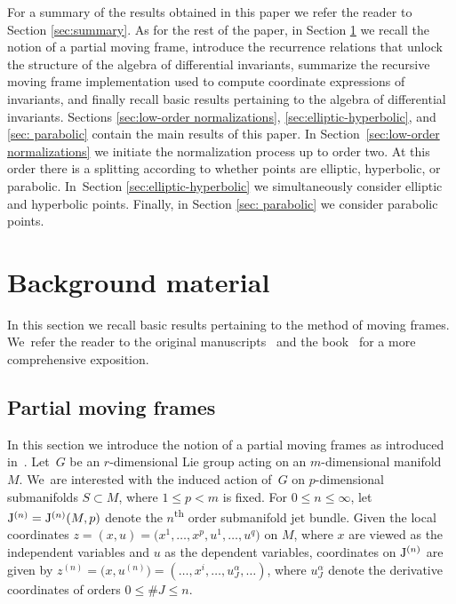 \documentclass[10pt,a4paper]{amsart}
\numberwithin{equation}{section}
\newcommand{\J}{{\rm J}}
\newcommand{\n}{^{(n)}}
\begin{document}
 For a summary of the results obtained in this paper we refer the reader to Section \ref{sec:summary}. As for the rest of the paper, in Section \ref{sec:background} we recall the notion of a partial moving frame, introduce the recurrence relations that unlock the structure of the algebra of differential invariants, summarize the recursive moving frame implementation used to compute coordinate expressions of invariants, and finally recall basic results pertaining to the algebra of differential invariants. Sections \ref{sec:low-order normalizations}, \ref{sec:elliptic-hyperbolic}, and \ref{sec: parabolic} contain the main results of this paper. In Section~\ref{sec:low-order normalizations} we initiate the normalization process up to order two. At this order there is a splitting according to whether points are elliptic, hyperbolic, or parabolic. In~Section \ref{sec:elliptic-hyperbolic} we simultaneously consider elliptic and hyperbolic points. Finally, in Section \ref{sec: parabolic} we consider parabolic points.

\section{Background material}\label{sec:background}

In this section we recall basic results pertaining to the method of moving frames. We~refer the reader to the original manuscripts~\cite{FO-1999,KO-2003,O-2011} and the book~\cite{M-2010} for a more comprehensive exposition.

\subsection{Partial moving frames}\label{sec:partial moving frames}

In this section we introduce the notion of a partial moving frames as introduced in~\cite{O-2011}. Let~$G$ be an $r$-dimensional Lie group acting on an $m$-dimensional manifold $M$. We~are interested with the induced action of~$G$ on $p$-dimensional submanifolds $S\subset M$, where $1\leq p < m$ is fixed. For $0\leq n \leq \infty$, let $\J\n = \J\n(M,p)$ denote the $n$\textsuperscript{th} order submanifold jet bundle. Given the local coordinates $z=(x,u)=\big(x^1,\dots,x^p,u^1,\dots,u^q\big)$ on $M$, where $x$ are viewed as the independent variables and $u$ as the dependent variables, coordinates on $\J\n$ are given by $z\n = \big(x,u\n\big)=(\dots, x^i, \dots, u^\alpha_J, \dots)$, where $u^\alpha_J$ denote the derivative coordinates of orders $0\leq \#J\leq n$.
\end{document}
